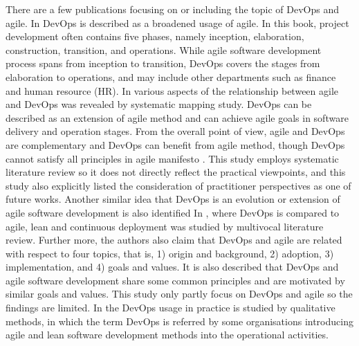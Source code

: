 \documentclass[
  12pt,
  a4paper,
]{article}
\begin{document}
There are a few publications focusing on or including the topic of
DevOps and agile. In \citep{huttermann2012devops-Developers} DevOps is
described as a broadened usage of agile. In this book, project
development often contains five phases, namely inception, elaboration,
construction, transition, and operations. While agile software
development process spans from inception to transition, DevOps covers
the stages from elaboration to operations, and may include other
departments such as finance and human resource (HR). In
\citep{Jabbari:2016:what-is-devops} various aspects of the relationship
between agile and DevOps was revealed by systematic mapping study.
DevOps can be described as an extension of agile method and can achieve
agile goals in software delivery and operation stages. From the overall
point of view, agile and DevOps are complementary and DevOps can benefit
from agile method, though DevOps cannot satisfy all principles in agile
manifesto \citep{Jabbari:2016:what-is-devops}. This study employs
systematic literature review so it does not directly reflect the
practical viewpoints, and this study also explicitly listed the
consideration of practitioner perspectives as one of future works.
Another similar idea that DevOps is an evolution or extension of agile
software development is also identified In
\citep{lwakatare2016:relationship}, where DevOps is compared to agile,
lean and continuous deployment was studied by multivocal literature
review. Further more, the authors also claim that DevOps and agile are
related with respect to four topics, that is, 1) origin and background,
2) adoption, 3) implementation, and 4) goals and values. It is also
described that DevOps and agile software development share some common
principles and are motivated by similar goals and values. This study
only partly focus on DevOps and agile so the findings are limited. In
\citep{erich:2017:devops-practice} the DevOps usage in practice is
studied by qualitative methods, in which the term DevOps is referred by
some organisations introducing agile and lean software development
methods into the operational activities.
\end{document}

